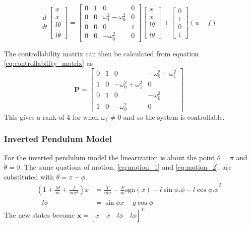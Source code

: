 \documentclass{article}
\begin{document}
\begin{equation}
  \frac{d}{dt} 
  \begin{bmatrix}
     x \\ \dot{x} \\ l\theta \\ \dot{l\theta} \end{bmatrix} = \begin{bmatrix} 
      0 & 1 & 0 & 0 \\ 0 & 0 & \omega_1^2 - \omega_0^2 & 0 \\ 0 & 0 & 0 & 1 \\ 0 & 0 & -\omega_0^2 & 0 \end{bmatrix} \begin{bmatrix} 
        x \\ \dot{x} \\ l\theta \\ \dot{l\theta} \end{bmatrix} + \begin{bmatrix} 
          0 \\ 1 \\ 0 \\ 1 \end{bmatrix} (u - f)
\end{equation}

The controllability matrix can then be calculated from equation \ref{eq:controllability_matrix} as
\begin{equation}
  \mathbf{P} = \left[\begin{matrix}0 & 1 & 0 & - \omega_{0}^{2} + \omega_{1}^{2}\\1 & 0 & - \omega_{0}^{2} + \omega_{1}^{2} & 0\\0 & 1 & 0 & - \omega_{0}^{2}\\1 & 0 & - \omega_{0}^{2} & 0\end{matrix}\right]
\end{equation}
This gives a rank of 4 for when $\omega_1 \neq 0$ and so the system is controllable.

\subsubsection{Inverted Pendulum Model}

For the inverted pendulum model the linearization is about the point $\theta = \pi$ and $\dot{\theta} = 0$.
The same quations of motion, \ref{eq:motion_1} and \ref{eq:motion_2}, are substituted with $\theta = \pi - \phi$.
\begin{align}
  \left( 1 + \frac{M}{m} + \frac{I}{ma^2} \right) \ddot{x} &= \frac{T}{ma} - \frac{F}{m}\text{sgn}(\dot{x}) - l\sin\phi . \ddot{\phi} - l\cos\phi . \dot{\phi}^2 \\
   - l \ddot{\phi} &= \sin\phi \ddot{x} - g\cos\phi
\end{align}
The new states become $\mathbf{x} = \left[ x \quad \dot{x} \quad l\phi \quad l\dot{\phi} \right]^T$
\end{document}
